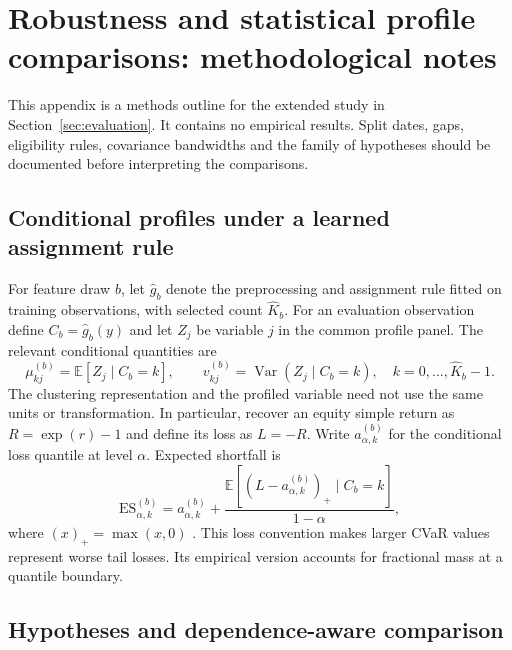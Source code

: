 \documentclass[11pt,a4paper]{article}
\begin{document}

\clearpage

\section{Robustness and statistical profile comparisons: methodological notes}
\label{app:profile-inference}
\setcounter{equation}{0}

This appendix is a methods outline for the extended study in Section~\ref{sec:evaluation}. It contains no empirical results. Split dates, gaps, eligibility rules, covariance bandwidths and the family of hypotheses should be documented before interpreting the comparisons.

\subsection{Conditional profiles under a learned assignment rule}

For feature draw $b$, let $\widehat g_b$ denote the preprocessing and assignment rule fitted on training observations, with selected count $\widehat K_b$. For an evaluation observation define $C_b=\widehat g_b(y)$ and let $Z_j$ be variable $j$ in the common profile panel. The relevant conditional quantities are
\begin{equation}
\mu_{kj}^{(b)}=\mathbb E[Z_j\mid C_b=k],
\qquad
v_{kj}^{(b)}=\operatorname{Var}(Z_j\mid C_b=k),
\quad k=0,\ldots,\widehat K_b-1.
\end{equation}
The clustering representation and the profiled variable need not use the same units or transformation. In particular, recover an equity simple return as $R=\exp(r)-1$ and define its loss as $L=-R$. Write $a_{\alpha,k}^{(b)}$ for the conditional loss quantile at level $\alpha$. Expected shortfall is
\begin{equation}
\mathrm{ES}_{\alpha,k}^{(b)}
=a_{\alpha,k}^{(b)}+
\frac{\mathbb E[(L-a_{\alpha,k}^{(b)})_+\mid C_b=k]}{1-\alpha},
\label{eq:profile-es}
\end{equation}
where $(x)_+=\max(x,0)$ \cite{rockafellaruryasev2000}. This loss convention makes larger CVaR values represent worse tail losses. Its empirical version accounts for fractional mass at a quantile boundary.

\subsection{Hypotheses and dependence-aware comparison}
\end{document}
